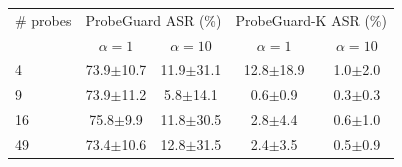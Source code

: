 \begin{tabular}{@{}lcccc@{}}
\toprule
\# probes & \multicolumn{2}{c}{ProbeGuard ASR (\%)} & \multicolumn{2}{c}{ProbeGuard-K ASR (\%)}\\
 & $\alpha=1$ & $\alpha=10$ & $\alpha=1$ & $\alpha=10$\\
\midrule
4 & 73.9$\pm$10.7 & 11.9$\pm$31.1 & 12.8$\pm$18.9 & 1.0$\pm$2.0\\
9 & 73.9$\pm$11.2 & 5.8$\pm$14.1 & 0.6$\pm$0.9 & 0.3$\pm$0.3\\
16 & 75.8$\pm$9.9 & 11.8$\pm$30.5 & 2.8$\pm$4.4 & 0.6$\pm$1.0\\
49 & 73.4$\pm$10.6 & 12.8$\pm$31.5 & 2.4$\pm$3.5 & 0.5$\pm$0.9\\
\bottomrule
\end{tabular}
